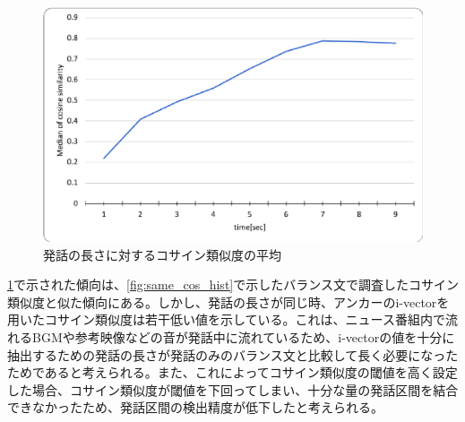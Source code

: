 \begin{figure}[H]
  \begin{center}
    \includegraphics[scale=0.8]{./figure/time_cos.eps}
  \end{center}
  \caption{発話の長さに対するコサイン類似度の平均 \label{fig:time_cos}}
\end{figure}

\ref{fig:time_cos}で示された傾向は、\ref{fig:same_cos_hist}で示したバランス文で調査したコサイン類似度と似た傾向にある。しかし、発話の長さが同じ時、アンカーのi-vectorを用いたコサイン類似度は若干低い値を示している。これは、ニュース番組内で流れるBGMや参考映像などの音が発話中に流れているため、i-vectorの値を十分に抽出するための発話の長さが発話のみのバランス文と比較して長く必要になったためであると考えられる。また、これによってコサイン類似度の閾値を高く設定した場合、コサイン類似度が閾値を下回ってしまい、十分な量の発話区間を結合できなかったため、発話区間の検出精度が低下したと考えられる。